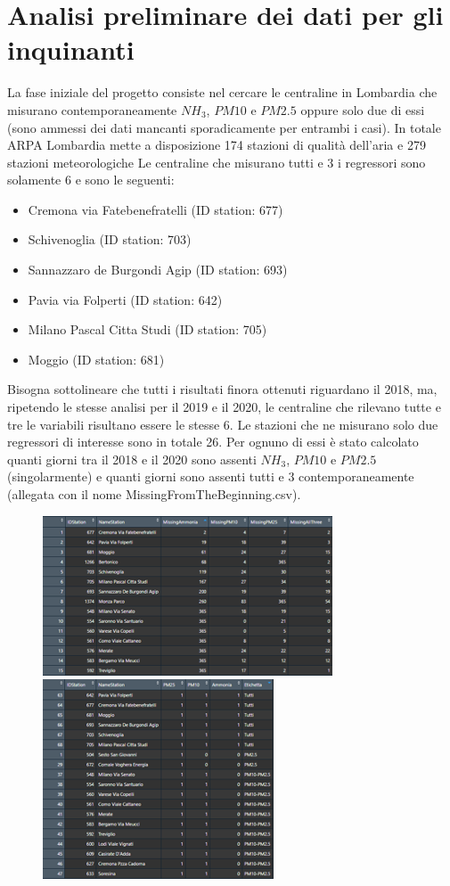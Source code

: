 \documentclass{article}
\begin{document}
\section{Analisi preliminare dei dati per gli inquinanti}
La fase iniziale del progetto consiste nel cercare le centraline in Lombardia
che misurano contemporaneamente $NH_{3}$, $PM10$ e $PM2.5$ oppure solo due di essi
(sono ammessi dei dati mancanti sporadicamente per entrambi i casi). In totale 
ARPA Lombardia mette a disposizione 174 stazioni di qualità dell'aria e 279 stazioni 
meteorologiche 
Le centraline che misurano tutti e 3 i regressori sono solamente 6 e sono le seguenti:
\begin{itemize}
    \item Cremona via Fatebenefratelli (ID station: 677)
    \item Schivenoglia (ID station: 703)
    \item Sannazzaro de Burgondi Agip (ID station: 693)
    \item Pavia via Folperti (ID station: 642)
    \item Milano Pascal Citta Studi (ID station: 705)
    \item Moggio (ID station: 681)
\end{itemize}
Bisogna sottolineare che tutti i risultati finora ottenuti riguardano il 2018, ma, ripetendo le stesse analisi per il 2019 e il 2020, 
le centraline che rilevano tutte e tre le variabili risultano essere le stesse 6.
Le stazioni che ne misurano solo due regressori di interesse sono in totale 26.
Per ognuno di essi è stato calcolato quanti giorni tra il 2018 e il 2020 sono assenti
$NH_{3}$, $PM10$ e $PM2.5$ (singolarmente) e quanti giorni sono assenti tutti e 3 contemporaneamente
(allegata con il nome MissingFromTheBeginning.csv). 
\begin{figure}[]
  \centering
  \includegraphics{b}
  \centering
  \includegraphics{PresenceTable.png}
\end{figure}
\end{document}
